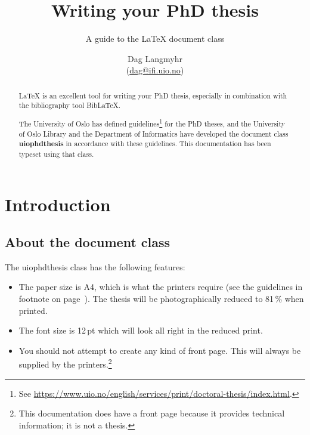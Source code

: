 \documentclass[UKenglish]{uiophdthesis}
\title{Writing your PhD thesis}
\subtitle{A guide to the \LaTeX{} document class \pb{uiophdthesis}}
\author{Dag Langmyhr\\ (\url{dag@ifi.uio.no})}
\newcommand{\p}[1]{\textsf{#1}}
\newcommand{\pb}[1]{\textbf{\p{#1}}}
\begin{document}
\uiomasterfp[kind=Documentation, compact, nosp, colour=grey,
  date=\today]

\maketitle

\begin{abstract}
\LaTeX{} is an excellent tool for writing your PhD thesis, especially in
combination with the bibliography tool Bib\LaTeX.

The University of Oslo has defined guidelines\footnote{\label{guidelines}See
  \url{https://www.uio.no/english/services/print/doctoral-thesis/index.html}.}
for the PhD theses, and 
the University of Oslo Library and the Department of Informatics have
developed the document class \pb{uiophdthesis} in accordance with these
guidelines. This documentation has been typeset using that class.
\end{abstract}

\tableofcontents

\part*{Introduction}

\chapter{About the document class}
The \p{uiophdthesis} class has the following features:
\begin{itemize}
\item The paper size is A4, which is what the printers require (see
  the guidelines in footnote on page~\pageref{guidelines}).
  The thesis will be photographically reduced to
  81\,\% when printed.

\item The font size is 12\,pt which will look all right in the reduced
  print.

\item You should not attempt to create any kind of front page. This
  will always be supplied by the printers.\footnote{This documentation
    does have a front page because it provides technical information;
    it is not a thesis.}
\end{itemize}
\end{document}
